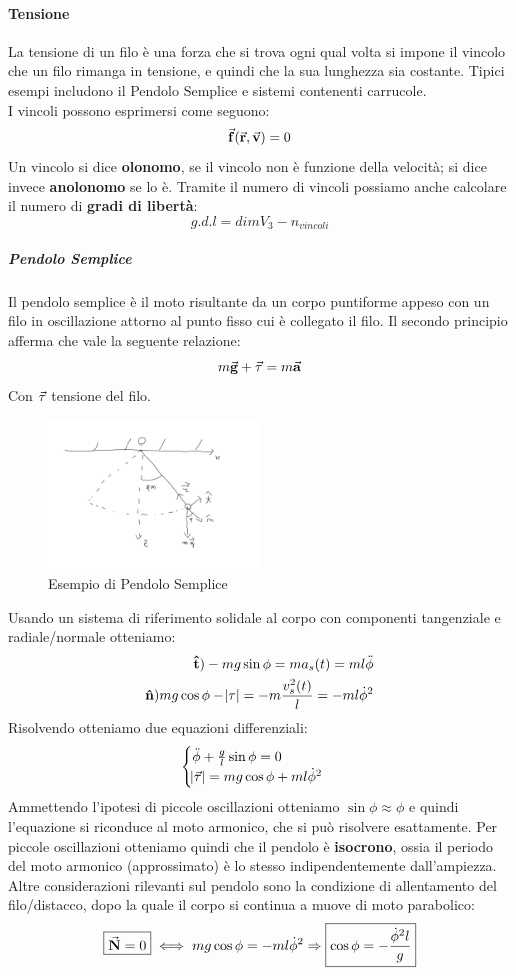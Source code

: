 \documentclass{report}
\newcommand{\then}{\ensuremath{\Rightarrow}}
\renewcommand{\a}{\va{a}}
\renewcommand{\v}{\va{v}}
\renewcommand{\r}{\va{r}}
\newcommand{\normvs}{\vu{n}}
\newcommand{\N}{\va{N}}
\newcommand{\g}{\va{g}}
\newcommand{\f}{\va{f}}
\begin{document}
\paragraph{Tensione}
La tensione di un filo è una forza che si trova ogni qual volta si impone il vincolo che un filo rimanga in tensione, e quindi che la sua lunghezza sia costante. Tipici esempi includono il Pendolo Semplice e sistemi contenenti carrucole.\\
I vincoli possono esprimersi come seguono:
\[\f(\r,\v)=0\]
Un vincolo si dice \textbf{olonomo}, se il vincolo non è funzione della velocità; si dice invece \textbf{anolonomo} se lo è. Tramite il numero di vincoli possiamo anche calcolare il numero di \textbf{gradi di libertà}:
\[g.d.l=dimV_3-n_{vincoli}\]
\subparagraph{Pendolo Semplice}
Il pendolo semplice è il moto risultante da un corpo puntiforme appeso con un filo in oscillazione attorno al punto fisso cui è collegato il filo. Il secondo principio afferma che vale la seguente relazione:
\[m\g+\va{\tau}=m\a\]
Con $\va{\tau}$ tensione del filo.
\begin{figure}[H]
    \centering
    \includegraphics[width=0.5\textwidth]{PendoloSemplice.png}
    \caption{Esempio di Pendolo Semplice}
\end{figure}
Usando un sistema di riferimento solidale al corpo con componenti tangenziale e radiale/normale otteniamo:
\begin{align}
\vu{t})-mg\sin\phi=ma_s(t)=ml\ddot{\phi}\\
\normvs)mg\cos\phi-\abs{\tau}=-m\frac{v_s^2(t)}{l}=-ml\Dot{\phi}^2
\end{align}
Risolvendo otteniamo due equazioni differenziali:
\begin{equation}
\begin{cases}
    \ddot{\phi}+\frac{g}{l}\sin\phi=0\\
    \abs{\va{\tau}}=mg\cos\phi+ml\Dot{\phi}^2
\end{cases}
\end{equation}
Ammettendo l'ipotesi di piccole oscillazioni otteniamo $\sin\phi\approx\phi$ e quindi l'equazione si riconduce al moto armonico, che si può risolvere esattamente. Per piccole oscillazioni otteniamo quindi che il pendolo è \textbf{isocrono}, ossia il periodo del moto armonico (approssimato) è lo stesso indipendentemente dall'ampiezza. \\
Altre considerazioni rilevanti sul pendolo sono la condizione di allentamento del filo/distacco, dopo la quale il corpo si continua a muove di moto parabolico:
\[\boxed{\N=0}\iff mg\cos\phi=-ml\Dot{\phi}^2\then \boxed{\cos\phi=-\frac{\Dot{\phi}^2l}{g}}\]
\end{document}
